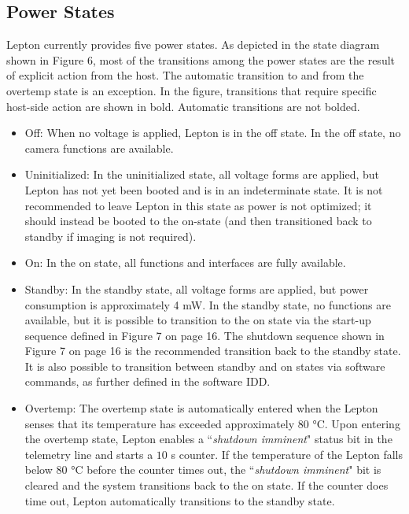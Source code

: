 \subsection{Power States}
\label{ssec:powerstate}
Lepton currently provides five power states. As depicted in the state diagram
shown in Figure 6, most of the transitions among the power states are the result
of explicit action from the host. The automatic transition to and from the
overtemp state is an exception. In the figure, transitions that require specific
host-side action are shown in bold. Automatic transitions are not bolded.
%
\begin{itemize}
    \item Off: When no voltage is applied, Lepton is in the off
state. In the off state, no camera functions are available.
    \item Uninitialized:
In the uninitialized state, all voltage forms are applied, but Lepton has not
yet been booted and is in an indeterminate state. It is not recommended to leave
Lepton in this state as power is not optimized; it should instead be booted to
the on-state (and then transitioned back to standby if imaging is not required).
    \item On: In the on state, all functions and interfaces are fully available.
    \item Standby: In the standby state, all voltage forms are applied, but power
consumption is approximately 4 \si{\milli\watt}. In the standby state, no
functions are available, but it is possible to transition to the on state via
the start-up sequence defined in Figure 7 on page 16. The shutdown sequence
shown in Figure 7 on page 16 is the recommended transition back to the standby
state. It is also possible to transition between standby and on states via
software commands, as further defined in the software IDD.
    \item Overtemp: The
overtemp state is automatically entered when the Lepton senses that its
temperature has exceeded approximately $80$ \si{\celsius}. Upon entering the
overtemp state, Lepton enables a ``\emph{shutdown imminent}" status bit in the
telemetry line and starts a $10$ \si{\second} counter. If the temperature of the
Lepton falls below $80$ \si{\celsius} before the counter times out, the
``\emph{shutdown imminent}" bit is cleared and the system transitions back to
the on state. If the counter does time out, Lepton automatically transitions to
the standby state.
\end{itemize}
%
